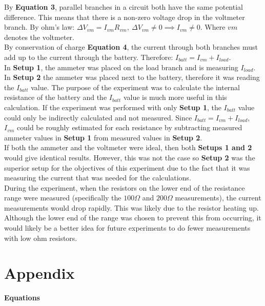 \documentclass[
	letterpaper, %
	10pt, %
]{CSUniSchoolLabReport}
\begin{document}
By \textbf{Equation 3}, parallel branches in a circuit both have the same potential
difference. This means that there is a non-zero voltage drop in the voltmeter branch. By ohm's law:
$\Delta V_{vm} = I_{vm} R_{vm}, \ \Delta V_{vm} \ne 0 \implies I_{vm} \ne 0$. Where $vm$ denotes the voltmeter.\\

By conservation of charge \textbf{Equation 4}, the current through both branches must add up to the current through the battery. Therefore: $I_{batt} = I_{vm} + I_{load}$.\\

In \textbf{Setup 1}, the ammeter was placed on the load branch and is measuring $I_{load}$. In \textbf{Setup 2} the
ammeter was placed next to the battery, therefore it was reading the $I_{batt}$ value. The
purpose of the experiment was to calculate the internal resistance of the battery and the $I_{batt}$ value is much more useful in this
calculation. If the experiment was performed with only \textbf{Setup 1}, the $I_{batt}$ value could only be indirectly calculated and
not measured. Since $I_{batt} = I_{vm} +I_{load}$, $I_{vm}$ could be roughly estimated for each resistance by
subtracting measured ammeter values in \textbf{Setup 1} from measured values in \textbf{Setup 2}.   \\

If both the ammeter and the voltmeter were ideal, then both \textbf{Setups 1 and 2} would give identical
results. However, this was not the case so \textbf{Setup 2} was the superior setup for the objectives of this
experiment due to the fact that it was measuring the current that was needed for the calculations.\\

During the experiment, when the resistors on the lower end of the resistance range were measured
(specifically the $100\Omega$ and $200\Omega$ measurements), the current measurements would drop rapidly. This was likely
due to the resistor heating up. Although the lower end of the range was chosen to prevent this from
occurring, it would likely be a better idea for future experiments to do fewer measurements with low ohm resistors.
\newpage
\section{Appendix}

{\large\textbf{Equations}}\\
\end{document}
